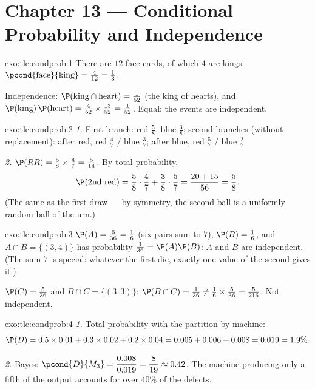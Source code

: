 \section*{Chapter 13 --- Conditional Probability and Independence}

\begin{solution}{exo:tle:condprob:1}
There are $12$ face cards, of which $4$ are kings:
$\pcond{\text{face}}{\text{king}} = \frac{4}{12} = \frac13$.

Independence: $\P(\text{king} \cap \text{heart}) = \frac{1}{52}$ (the king
of hearts), and
$\P(\text{king})\,\P(\text{heart}) = \frac{4}{52}\times\frac{13}{52}
= \frac{1}{52}$. Equal: the events are independent.
\end{solution}

\begin{solution}{exo:tle:condprob:2}
\emph{1.} First branch: red $\frac58$, blue $\frac38$; second branches
(without replacement): after red, red $\frac47$ / blue $\frac37$; after
blue, red $\frac57$ / blue $\frac27$.

\emph{2.} $\P(RR) = \frac58 \times \frac47 = \frac{5}{14}$. By total
probability,
\[
\P(\text{2nd red}) = \frac58\cdot\frac47 + \frac38\cdot\frac57
= \frac{20 + 15}{56} = \frac58 .
\]
(The same as the first draw --- by symmetry, the second ball is a uniformly
random ball of the urn.)
\end{solution}

\begin{solution}{exo:tle:condprob:3}
$\P(A) = \frac{6}{36} = \frac16$ (six pairs sum to $7$),
$\P(B) = \frac16$, and $A \cap B = \{(3,4)\}$ has probability
$\frac{1}{36} = \P(A)\P(B)$: $A$ and $B$ are independent. (The sum $7$ is
special: whatever the first die, exactly one value of the second gives it.)

$\P(C) = \frac{5}{36}$ and $B \cap C = \{(3,3)\}$:
$\P(B \cap C) = \frac{1}{36} \neq \frac16 \times \frac{5}{36}
= \frac{5}{216}$. Not independent.
\end{solution}

\begin{solution}{exo:tle:condprob:4}
\emph{1.} Total probability with the partition by machine:
\[
\P(D) = 0.5\times0.01 + 0.3\times0.02 + 0.2\times0.04
= 0.005 + 0.006 + 0.008 = 0.019 = 1.9\% .
\]

\emph{2.} Bayes:
$\pcond{D}{M_3} = \dfrac{0.008}{0.019} = \dfrac{8}{19} \approx 0.42$. The
machine producing only a fifth of the output accounts for over $40\%$ of
the defects.
\end{solution}

